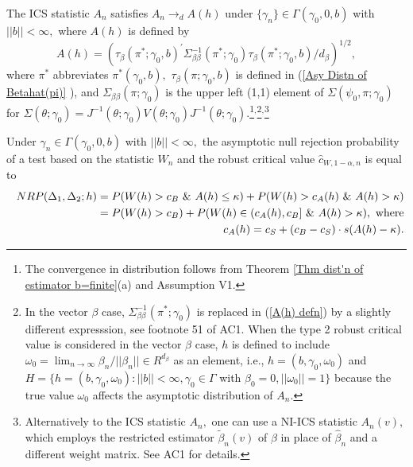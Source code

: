 \documentclass[12pt,titlepage,final,oneside,letterpaper]{article}
\begin{document}
The ICS statistic $A_{n}$ satisfies $A_{n}\rightarrow _{d}A(h)$ under $\{
\gamma _{n}\} \in \Gamma (\gamma _{0},0,b)$ with $||b||<\infty ,$ where $%
A(h) $ is defined by%
\begin{equation}
A(h)=\left( \tau _{\beta }(\pi ^{\ast };\gamma _{0},b)^{\prime }\Sigma
_{\beta \beta }^{-1}(\pi ^{\ast };\gamma _{0})\tau _{\beta }(\pi ^{\ast
};\gamma _{0},b)/d_{\beta }\right) ^{1/2},  \label{A(h) defn}
\end{equation}%
where $\pi ^{\ast }$ abbreviates $\pi ^{\ast }(\gamma _{0},b),$ $\tau
_{\beta }(\pi ;\gamma _{0},b)$ is defined in (\ref{Asy Distn of Betahat(pi)}%
), and $\Sigma _{\beta \beta }(\pi ;\gamma _{0})$ is the upper left (1,1)
element of $\Sigma (\psi _{0},\pi ;\gamma _{0})$ for $\Sigma (\theta ;\gamma
_{0})=J^{-1}(\theta ;\gamma _{0})V(\theta ;\gamma _{0})J^{-1}(\theta ;\gamma
_{0}).$\footnote{%
The convergence in distribution follows from Theorem \ref{Thm dist'n of
estimator b=finite}(a) and Assumption V1.}$^{,}$\footnote{%
In the vector $\beta $ case, $\Sigma _{\beta \beta }^{-1}(\pi ^{\ast
};\gamma _{0})$ is replaced in (\ref{A(h) defn}) by a slightly different
expresssion, see footnote 51 of AC1. When the type 2 robust critical value
is considered in the vector $\beta $ case, $h$ is defined to include $\omega
_{0}=\lim_{n\rightarrow \infty }\beta _{n}/||\beta _{n}||\in R^{d_{\beta }}$
as an element, i.e., $h=(b,\gamma _{0},\omega _{0})$ and $H=\{h=(b,\gamma
_{0},\omega _{0}):||b||<\infty ,\gamma _{0}\in \Gamma $ with $\beta
_{0}=0,||\omega _{0}||=1\}$ because the true value $\omega _{0}$ affects the
asymptotic distribution of $A_{n}.$}$^{,}$\footnote{%
Alternatively to the ICS statistic $A_{n},$ one can use a NI-ICS statistic $%
A_{n}(v),$ which employs the restricted estimator $\widetilde{\beta }_{n}(v)$
of $\beta $ in place of $\widehat{\beta }_{n}$ and a different weight
matrix. See AC1 for details.
\par
{}}

Under $\gamma _{n}\in \Gamma (\gamma _{0},0,b)$ with $||b||<\infty ,$ the
asymptotic null rejection probability of a test based on the statistic $%
W_{n} $ and the robust critical value $\widehat{c}_{W,1-\alpha ,n}$ is equal
to%
\begin{eqnarray}
&&\hspace{-0.2in}NRP(\Delta _{1},\Delta _{2};h)\overset{}{=}P(W(h)\overset{}{%
>}c_{B}\text{ \& }A(h)\overset{}{\leq }\kappa )+P(W(h)\overset{}{>}c_{A}(h)%
\text{ \& }A(h)\overset{}{>}\kappa )  \notag \\
&&\hspace{-0.2in}\hspace{1.21in}\overset{}{=}P(W(h)\overset{}{>}c_{B})+P(W(h)%
\overset{}{\in }(c_{A}(h),c_{B}]\text{ \& }A(h)\overset{}{>}\kappa ),\text{
where}  \notag \\
&&\hspace{-0.2in}c_{A}(h)\overset{}{=}c_{S}+(c_{B}-c_{S})\cdot s(A(h)-\kappa
).  \label{NRP defn}
\end{eqnarray}
\end{document}
